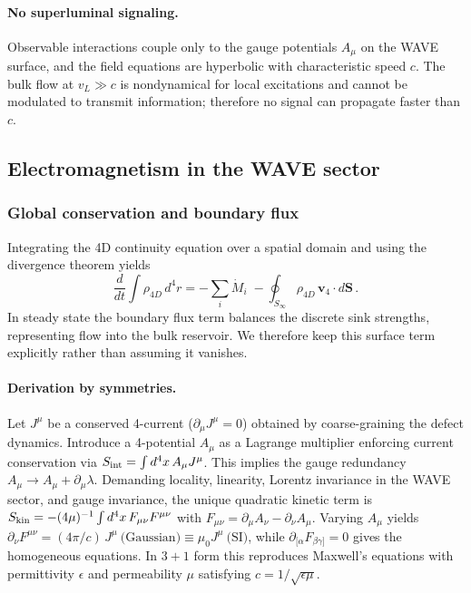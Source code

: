 \paragraph{No superluminal signaling.} Observable interactions couple only to the gauge potentials $A_\mu$ on the WAVE surface, and the field equations are hyperbolic with characteristic speed $c$. The bulk flow at $v_L\gg c$ is nondynamical for local excitations and cannot be modulated to transmit information; therefore no signal can propagate faster than $c$.
\subsection{Electromagnetism in the WAVE sector}
\subsubsection{Global conservation and boundary flux}
Integrating the 4D continuity equation over a spatial domain and using the divergence theorem yields
\begin{equation}
\frac{d}{dt}\int \rho_{4D}\, d^4r = -\sum_i \dot M_i \;-
\oint_{S_\infty} \rho_{4D}\, \mathbf v_4\cdot d\mathbf S\,.
\end{equation}
In steady state the boundary flux term balances the discrete sink strengths, representing flow into the bulk reservoir. We therefore keep this surface term explicitly rather than assuming it vanishes.

\paragraph{Derivation by symmetries.} Let $J^\mu$ be a conserved 4-current ($\partial_\mu J^\mu=0$) obtained by coarse-graining the defect dynamics. Introduce a 4-potential $A_\mu$ as a Lagrange multiplier enforcing current conservation via $S_{\rm int}=\int d^4x\, A_\mu J^\mu$. This implies the gauge redundancy $A_\mu\to A_\mu+\partial_\mu\lambda$. Demanding locality, linearity, Lorentz invariance in the WAVE sector, and gauge invariance, the unique quadratic kinetic term is $S_{\rm kin}=-(4\mu)^{-1}\int d^4x\, F_{\mu\nu}F^{\mu\nu}$ with $F_{\mu\nu}=\partial_\mu A_\nu-\partial_\nu A_\mu$. Varying $A_\mu$ yields $\partial_\nu F^{\mu\nu} = (4\pi/c)\, J^\mu\ \text{(Gaussian)}\equiv \mu_0 J^\mu\ \text{(SI)}$, while $\partial_{[\alpha}F_{\beta\gamma]}=0$ gives the homogeneous equations. In $3{+}1$ form this reproduces Maxwell's equations with permittivity $\epsilon$ and permeability $\mu$ satisfying $c=1/\sqrt{\epsilon\mu}$.

